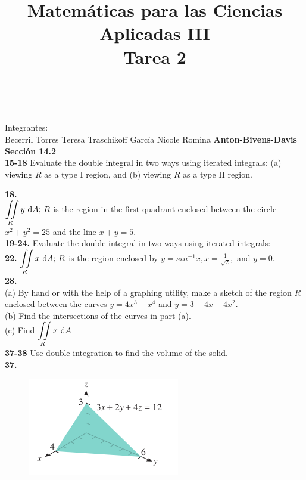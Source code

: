 \documentclass[11pt]{report}
\begin{document}
{}
\title{Matemáticas para las Ciencias Aplicadas III \\ Tarea 2}
\
\maketitle
Integrantes: \\ 
    Becerril Torres Teresa
    Traschikoff García Nicole Romina
\textbf{Anton-Bivens-Davis} \\

\textbf{Sección 14.2} \\

\textbf{15-18} Evaluate the double integral in two ways using iterated integrals:
(a) viewing $R$ as a type I region, and (b) viewing $R$ as a type II region.

\textbf{18.} \\

$ {\displaystyle \iint \limits_R } \, y \, \, \text dA; \, R$ is the region in the first
quadrant enclosed between the circle $x^2 + y^2 = 25$ and the line $x + y = 5$. \\

\textbf{19-24.} Evaluate the double integral in two ways using iterated integrals: \\

\textbf{22.} $ {\displaystyle \iint \limits_R } \, x \, \, \text dA; \, R$ is the region
enclosed by $y = sin^{-1} x, x = \frac{1}{\sqrt{2}},$ and $y = 0$. \\

\textbf{28.} \\

(a) By hand or with the help of a graphing utility, make a sketch of the region
$R$ enclosed between the curves $y = 4x^3 - x^4$ and $y = 3 - 4x + 4x^2$. \\

(b) Find the intersections of the curves in part (a). \\

(c) Find $ {\displaystyle \iint \limits_R } \, x \, \, \text dA $ \\

\textbf{37-38} Use double integration to find the volume of the solid. \\

\textbf{37.} \\

\begin{figure}[h]
\includegraphics[scale=0.5]{img1.png}
\centering
\end{figure}
\end{document}
